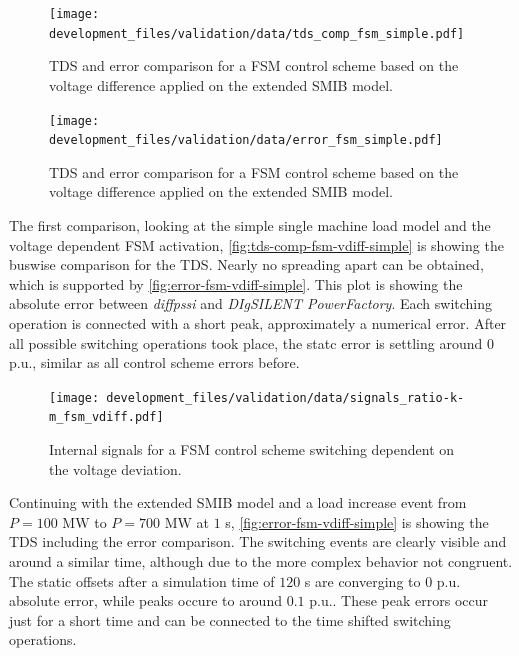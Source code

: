\begin{figure}[htbp!]
    \centering
    \texttt{[image: development\_files/validation/data/tds\_comp\_fsm\_simple.pdf]}
    \caption[\acs{TDS} and error comparison for a \acs{FSM} control scheme based on the voltage difference applied on the extended \acs{SMIB} model]{\acs{TDS} and error comparison for a \acs{FSM} control scheme based on the voltage difference applied on the extended \acs{SMIB} model.}
    \label{fig:tds-comp-fsm-vdiff-simple}
\end{figure}

\begin{figure}[htbp!]
    \centering
    \texttt{[image: development\_files/validation/data/error\_fsm\_simple.pdf]}
    \caption[\acs{TDS} and error comparison for a \acs{FSM} control scheme based on the voltage difference applied on the extended \acs{SMIB} model]{\acs{TDS} and error comparison for a \acs{FSM} control scheme based on the voltage difference applied on the extended \acs{SMIB} model.}
    \label{fig:error-fsm-vdiff-simple}
\end{figure}

The first comparison, looking at the simple single machine load model and the voltage dependent \acs{FSM} activation, \autoref{fig:tds-comp-fsm-vdiff-simple} is showing the buswise comparison for the \acs{TDS}.
Nearly no spreading apart can be obtained, which is supported by \autoref{fig:error-fsm-vdiff-simple}.
This plot is showing the absolute error between \textit{diffpssi} and \textit{DIgSILENT PowerFactory}.
Each switching operation is connected with a short peak, approximately a numerical error.
After all possible switching operations took place, the statc error is settling around $0$ p.u., similar as all control scheme errors before.

\begin{figure}[htbp!]
    \centering
    \texttt{[image: development\_files/validation/data/signals\_ratio-k-m\_fsm\_vdiff.pdf]}
    \caption[Internal signals for a \acs{FSM} control scheme switching dependent on the voltage deviation]{Internal signals for a \acs{FSM} control scheme switching dependent on the voltage deviation.}
    \label{fig:signals-fsm-vdiff-ext-smib}
\end{figure}

Continuing with the extended \acs{SMIB} model and a load increase event from $P=100\text{ MW}$ to $P=700\text{ MW}$ at $1$ s, \autoref{fig:error-fsm-vdiff-simple} is showing the \acs{TDS} including the error comparison.
The switching events are clearly visible and around a similar time, although due to the more complex behavior not congruent.
The static offsets after a simulation time of $120$ s are converging to $0$ p.u. absolute error, while peaks occure to around $0.1$ p.u..
These peak errors occur just for a short time and can be connected to the time shifted switching operations.

